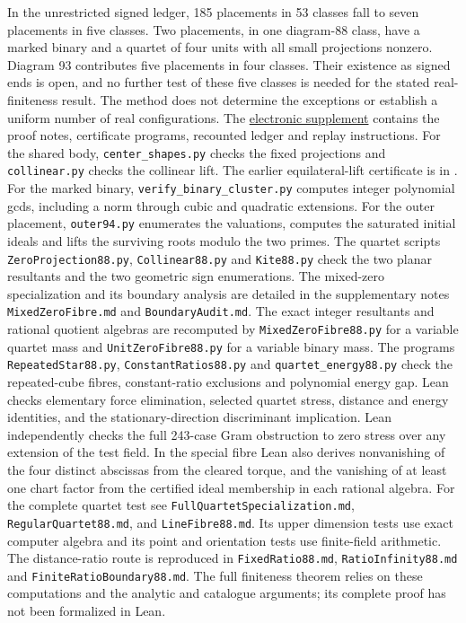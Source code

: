\documentclass[11pt]{article}
\newcommand{\supplement}{\href{https://github.com/rongyulin/physics-open-problems-AI/tree/main/problems/planar-central-configurations/notes/last-diagrams}{electronic supplement}}
\begin{document}
In the unrestricted signed ledger, 185 placements in 53 classes fall to seven placements in five classes. Two placements, in one diagram-88 class, have a marked binary and a quartet of four units with all small projections nonzero. Diagram 93 contributes five placements in four classes. Their existence as signed ends is open, and no further test of these five classes is needed for the stated real-finiteness result. The method does not determine the exceptions or establish a uniform number of real configurations.
The \supplement{} contains the proof notes, certificate programs, recounted ledger and replay instructions. For the shared body, \texttt{center\_shapes.py} checks the fixed projections and \texttt{collinear.py} checks the collinear lift. The earlier equilateral-lift certificate is in \cite{Previous}. For the marked binary, \texttt{verify\_binary\_cluster.py} computes integer polynomial gcds, including a norm through cubic and quadratic extensions. For the outer placement, \texttt{outer94.py} enumerates the valuations, computes the saturated initial ideals and lifts the surviving roots modulo the two primes. The quartet scripts \texttt{ZeroProjection88.py}, \texttt{Collinear88.py} and \texttt{Kite88.py} check the two planar resultants and the two geometric sign enumerations. The mixed-zero specialization and its boundary analysis are detailed in the supplementary notes \texttt{MixedZeroFibre.md} and \texttt{BoundaryAudit.md}. The exact integer resultants and rational quotient algebras are recomputed by \texttt{MixedZeroFibre88.py} for a variable quartet mass and \texttt{UnitZeroFibre88.py} for a variable binary mass. The programs \texttt{RepeatedStar88.py}, \texttt{ConstantRatios88.py} and \texttt{quartet\_energy88.py} check the repeated-cube fibres, constant-ratio exclusions and polynomial energy gap. Lean checks elementary force elimination, selected quartet stress, distance and energy identities, and the stationary-direction discriminant implication. Lean independently checks the full 243-case Gram obstruction to zero stress over any extension of the test field. In the special fibre Lean also derives nonvanishing of the four distinct abscissas from the cleared torque, and the vanishing of at least one chart factor from the certified ideal membership in each rational algebra. For the complete quartet test see \texttt{FullQuartetSpecialization.md}, \texttt{RegularQuartet88.md}, and \texttt{LineFibre88.md}. Its upper dimension tests use exact computer algebra and its point and orientation tests use finite-field arithmetic. The distance-ratio route is reproduced in \texttt{FixedRatio88.md}, \texttt{RatioInfinity88.md} and \texttt{FiniteRatioBoundary88.md}. The full finiteness theorem relies on these computations and the analytic and catalogue arguments; its complete proof has not been formalized in Lean.
\end{document}
